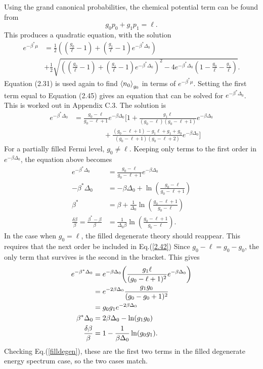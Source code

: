 Using the grand canonical probabilities, the chemical potential term can be found from
\begin{equation}
    g_0 p_0+g_1 p_1=\ell. \label{2.40}
\end{equation}
This produces a quadratic equation, with the solution
\begin{align}
    e^{-\beta^*\mu }&=\frac{1}{2}((\frac{g_0}{\ell}-1)+(\frac{g_1}{\ell}-1)e^{-\beta^*\Delta_0})\nonumber\\
    &+\frac{1}{2}\sqrt{((\frac{g_0}{\ell}-1)+(\frac{g_1}{\ell}-1)e^{-\beta^*\Delta_0})^2-4e^{-\beta^*\Delta_0}(1-\frac{g_0}{\ell}-\frac{g_1}{\ell})}.
\end{align}
Equation (2.31) is used again to find $\left<{n_0}\right>_{g_0}$ in terms of $e^{-\beta^*\mu}$.
Setting the first term equal to Equation (2.45) gives an equation that can be solved for $e^{-\beta^*\Delta_0}$. This is worked out in Appendix C.3. The solution is
\begin{align}
    e^{-\beta^*\Delta_0}&=\frac{g_0-\ell}{g_0-\ell+1}e^{-\beta\Delta_0} \Biggr[1+\frac{g_1 \ell}{(g_0-\ell)(g_0-\ell+1)}e^{-\beta\Delta_0}\nonumber\\
    &\ \ \ \ \ \ \ \ \ \ \ \ \ \ \ \ \ \ \ +\frac{(g_0-\ell+1)-g_1\ell+g_1+g_0}{(g_0-\ell+1)(g_0-\ell+2)}e^{-\beta\Delta_0}\Biggr] \label{2.42}
\end{align}
For a partially filled Fermi level, $g_0\neq \ell$. Keeping only terms to the first order in $e^{-\beta\Delta_0}$, the equation above becomes
\begin{align}
    e^{-\beta^*\Delta_0}&=\frac{g_0-\ell}{g_0-\ell+1} e^{-\beta\Delta_0}\nonumber\\
    -\beta^*\Delta_0&=-\beta\Delta_0+\ln(\frac{g_0-\ell}{g_0-\ell+1})\nonumber\\
    \beta^*&=\beta+\frac{1}{\Delta_0}\ln(\frac{g_0-\ell+1}{g_0-\ell})\nonumber\\
    \frac{\delta\beta}{\beta}=\frac{\beta^*-\beta}{\beta}&=\frac{1}{\Delta_0 \beta}\ln(\frac{g_0-\ell+1}{g_0-\ell}). \label{partfilldegen1}
\end{align}
In the case when $g_0=\ell$, the filled degenerate theory should reappear. This requires that the next order be included in Eq.\@ (\ref{2.42}) Since $g_0-\ell=g_0-g_0$, the only term that survives is the second in the bracket. This gives
\begin{align}
    e^{-\beta^*\Delta_0}&= e^{-\beta\Delta_0} \qty(\frac{g_1 \ell}{(g_0-\ell+1)^2} e^{-\beta\Delta_0})\nonumber\\
    &=e^{-2\beta\Delta_0} \frac{g_1 g_0}{(g_0-g_0+1)^2}\nonumber\\
    &=g_0g_1e^{-2\beta\Delta_0}\nonumber\\
    \beta^*\Delta_0&=2\beta\Delta_0 - \ln(g_1g_0)\nonumber\\
    \frac{\delta\beta}{\beta}&=1-\frac{1}{\beta\Delta_0} \ln(g_0g_1). \label{partfilldegen}
\end{align}
Checking Eq.\@ (\ref{filldegen}), these are the first two terms in the filled degenerate energy spectrum case, so the two cases match. 
